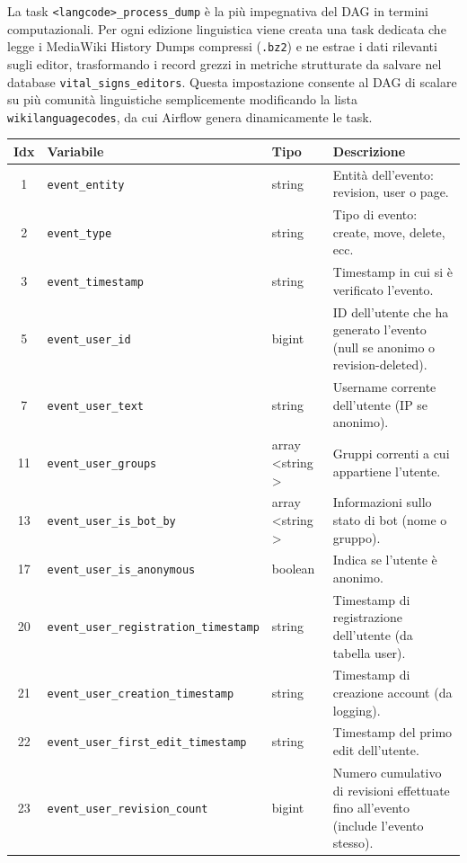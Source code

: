 La task \texttt{<langcode>\_process\_dump} è la più impegnativa del DAG in termini computazionali. 
Per ogni edizione linguistica viene creata una task dedicata che legge i MediaWiki History Dumps compressi (\texttt{.bz2}) e ne estrae i dati rilevanti sugli editor, trasformando i record grezzi in metriche strutturate da salvare nel database \texttt{vital\_signs\_editors}. 
Questa impostazione consente al DAG di scalare su più comunità linguistiche semplicemente modificando la lista \texttt{wikilanguagecodes}, da cui Airflow genera dinamicamente le task.

\begin{table}[h]
\centering
\scriptsize
\begin{tabular}{|c|l|l|p{8cm}|}
\hline
\textbf{Idx} & \textbf{Variabile} & \textbf{Tipo} & \textbf{Descrizione} \\
\hline
1  & \texttt{event\_entity} & string & Entità dell'evento: revision, user o page. \\
2  & \texttt{event\_type} & string & Tipo di evento: create, move, delete, ecc. \\
3  & \texttt{event\_timestamp} & string & Timestamp in cui si è verificato l’evento. \\
5  & \texttt{event\_user\_id} & bigint & ID dell’utente che ha generato l’evento (null se anonimo o revision-deleted). \\
7  & \texttt{event\_user\_text} & string & Username corrente dell’utente (IP se anonimo). \\
11 & \texttt{event\_user\_groups} & array \textless string \textgreater & Gruppi correnti a cui appartiene l’utente. \\
13 & \texttt{event\_user\_is\_bot\_by} & array \textless string \textgreater & Informazioni sullo stato di bot (nome o gruppo). \\
17 & \texttt{event\_user\_is\_anonymous} & boolean & Indica se l’utente è anonimo. \\
20 & \texttt{event\_user\_registration\_timestamp} & string & Timestamp di registrazione dell’utente (da tabella user). \\
21 & \texttt{event\_user\_creation\_timestamp} & string & Timestamp di creazione account (da logging). \\
22 & \texttt{event\_user\_first\_edit\_timestamp} & string & Timestamp del primo edit dell’utente. \\
23 & \texttt{event\_user\_revision\_count} & bigint & Numero cumulativo di revisioni effettuate fino all’evento (include l’evento stesso). \\

\end{tabular}
\end{table}
